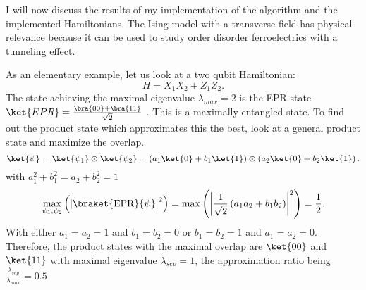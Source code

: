 I will now discuss the results of my implementation of the algorithm and the implemented Hamiltonians.
The Ising model with a transverse field has physical relevance because it can be used to study order disorder ferroelectrics with a tunneling effect.


As an elementary example, let us look at a two qubit Hamiltonian: \[
H=X_1X_2+Z_1Z_2
.\]
The state achieving the maximal eigenvalue $\lambda_{max}=2$ is the EPR-state $\ket{EPR}=\frac{\bra{00}+\bra{11}}{\sqrt{2}}$ .
This is a maximally entangled state.
To find out the product state which approximates this the best, look at a general product state and maximize the overlap.
\[
	\ket{\psi}=\ket{\psi_1}\otimes\ket{\psi_2}=\left(a_1\ket{0}+b_1\ket{1}\right)\otimes\left(a_2\ket{0}+b_2\ket{1}\right)
.\] with $a_1^2+b_1^2=a_2+b_2^2=1$
\[
\max_{\psi_1,\psi_2}\left(\left|\braket{\text{EPR}}{\psi}\right|^2\right)=\max\left(\left|\frac{1}{\sqrt{2}}\left(a_1a_2+b_1b_2\right)\right|^2\right)=\frac{1}{2}
.\]
With either $a_1=a_2=1$ and $b_1=b_2=0$ or $b_1=b_2=1$ and $a_1=a_2=0$.
Therefore, the product states with the maximal overlap are $\ket{00}$ and $\ket{11}$ with maximal eigenvalue $\lambda_{sep}=1$, the approximation ratio being  $\frac{\lambda_{sep}}{\lambda_{max}} = 0.5 $\\
